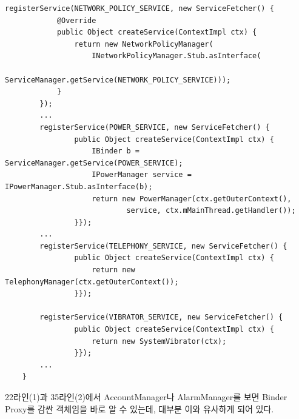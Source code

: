 \begin{lstlisting}[frame=single, caption=ContextImpl.java]
        registerService(NETWORK_POLICY_SERVICE, new ServiceFetcher() {
            @Override
            public Object createService(ContextImpl ctx) {
                return new NetworkPolicyManager(
                	INetworkPolicyManager.Stub.asInterface(
                    ServiceManager.getService(NETWORK_POLICY_SERVICE)));
            }
        });
		...
        registerService(POWER_SERVICE, new ServiceFetcher() {
                public Object createService(ContextImpl ctx) {
                    IBinder b = ServiceManager.getService(POWER_SERVICE);
                    IPowerManager service = IPowerManager.Stub.asInterface(b);
                    return new PowerManager(ctx.getOuterContext(),
                            service, ctx.mMainThread.getHandler());
                }});
		...
        registerService(TELEPHONY_SERVICE, new ServiceFetcher() {
                public Object createService(ContextImpl ctx) {
                    return new TelephonyManager(ctx.getOuterContext());
                }});

        registerService(VIBRATOR_SERVICE, new ServiceFetcher() {
                public Object createService(ContextImpl ctx) {
                    return new SystemVibrator(ctx);
                }});
		...
    }
\end{lstlisting}
22라인(1)과 35라인(2)에서 AccountManager나 AlarmManager를 보면 Binder Proxy를 감싼 객체임을 바로 알 수 있는데, 대부분 이와 유사하게 되어 있다.


